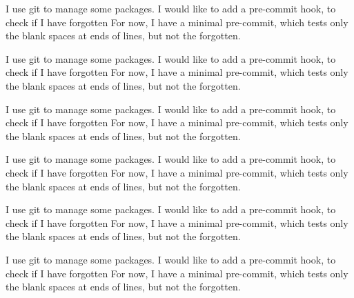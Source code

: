 \documentclass{book}
\begin{document}
\begin{pages}
\begin{Leftside}
\pstart
{}
\pend

\pstart
I use git to manage some packages.
I would like to add a pre-commit hook, to check if I have forgotten
For now, I have a minimal pre-commit, which tests only the blank spaces at ends of lines, but not the forgotten.
\pend


\endnumbering
\end{Leftside}

\begin{Rightside}

\beginnumbering
\pstart
{}
\pend

\pstart
I use git to manage some packages.
I would like to add a pre-commit hook, to check if I have forgotten
For now, I have a minimal pre-commit, which tests only the blank spaces at ends of lines, but not the forgotten.
\pend

\pstart
{}
\pend

\pstart
{}
\pend

\pstart
{}
\pend

\pstart
I use git to manage some packages.
I would like to add a pre-commit hook, to check if I have forgotten
For now, I have a minimal pre-commit, which tests only the blank spaces at ends of lines, but not the forgotten.
\pend

\pstart
{}
\pend

\pstart
I use git to manage some packages.
I would like to add a pre-commit hook, to check if I have forgotten
For now, I have a minimal pre-commit, which tests only the blank spaces at ends of lines, but not the forgotten.
\pend


\pstart
I use git to manage some packages.
I would like to add a pre-commit hook, to check if I have forgotten
For now, I have a minimal pre-commit, which tests only the blank spaces at ends of lines, but not the forgotten.
\pend

\pstart
{}
\pend

\pstart
{}
\pend

\pstart
{}
\pend

\pstart
I use git to manage some packages.
I would like to add a pre-commit hook, to check if I have forgotten
For now, I have a minimal pre-commit, which tests only the blank spaces at ends of lines, but not the forgotten.
\pend


\end{Rightside}
\end{pages}
\end{document}
